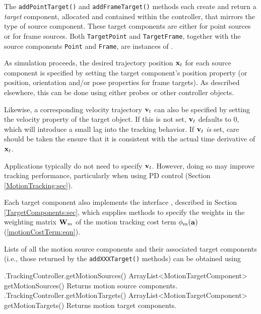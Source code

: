 The {\tt addPointTarget()} and {\tt addFrameTarget()} methods each create and
return a {\it target} component, allocated and contained within the controller,
that mirrors the type of source component.  These target components are
either  for point sources or
 for frame sources.
Both {\tt TargetPoint} and {\tt TargetFrame}, together with the source
components {\tt Point} and {\tt Frame}, are instances of
.

As simulation proceeds, the desired trajectory position ${\bf x}_t$ for each
source component is specified by setting the target component's {\sf position}
property (or {\sf position}, {\sf orientation} and/or {\sf pose} properties for
frame targets).  As described elsewhere, this can be done using either probes
or other controller objects.

Likewise, a corresponding velocity trajectory ${\bf v}_t$ can also be specified by
setting the {\sf velocity} property of the target object.  If this is not set,
${\bf v}_t$ defaults to 0, which will introduce a small lag into the tracking
behavior. If ${\bf v}_t$ {\it is} set, care should be taken the ensure that it is
consistent with the actual time derivative of ${\bf x}_t$.

\begin{sideblock}
Applications typically do not need to specify ${\bf v}_t$. However, doing so may
improve tracking performance, particularly when using PD control
(Section \ref{MotionTracking:sec}).
\end{sideblock}

Each target component also implements the interface
, described in
Section \ref{TargetComponents:sec}, which supplies methods to specify the
weights in the weighting matrix ${\bf W}_m$ of the motion tracking cost term
$\phi_m({\bf a})$ (\ref{motionCostTerm:eqn}).

Lists of all the motion source components and their associated target
components (i.e., those returned by the {\tt addXXXTarget()} methods) can be
obtained using
%
\begin{methodtable}{0.58}{0.42}
\midline
%
\methodentry
{\inverse.TrackingController.getMotionSources()}%
{ArrayList<MotionTargetComponent> getMotionSources()}%
{Returns motion source components.}%
%
\methodentry
{\inverse.TrackingController.getMotionTargets()}%
{ArrayList<MotionTargetComponent> getMotionTargets()}%
{Returns motion target components.}%
%
\midline
\end{methodtable}
%

